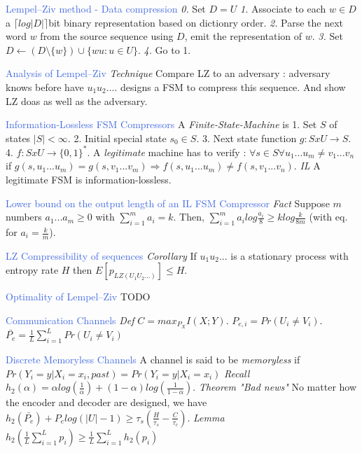 \documentclass[10pt,a4paper,landscape]{article}
\newcommand{\concept}[1]{\textcolor{RoyalBlue}{#1}}
\newcommand{\subconcept}[1]{\textcolor{PineGreen}{\textit{#1}}}
\renewcommand{\section}[1]{
    \vspace{-0.3cm}
    \begin{center}
      \color{Bittersweet}
      \hrulefill{\small~~#1~~}\hrulefill
    \end{center}
    \vspace{-0.3cm}
  }
\begin{document}
\begin{multicols*}{4}
\concept{Lempel–Ziv method - Data compression}
\subconcept{0.} Set $D=U$
\subconcept{1.} Associate to each $w \in D$ a $\lceil log|D| \rceil$bit binary representation based on dictionry order.
\subconcept{2.} Parse the next word $w$ from the source sequence using $D$, emit the representation of $w$.
\subconcept{3.} Set $D \leftarrow (D\setminus \{w\})\cup \{wu:u \in U \}$.
\subconcept{4.} Go to 1.

\concept{Analysis of Lempel–Ziv} 
\subconcept{Technique} Compare LZ to an adversary : 
adversary knows before have $u_1u_2...$.
designs a FSM to compress this sequence.
And show LZ doas as well as the adversary.


\concept{Information-Lossless FSM Compressors}
A \subconcept{Finite-State-Machine} is 1. Set $S$ of states $|S|<\infty$.
2. Initial special state $s_0 \in S$.
3. Next state function $g:SxU \to S$.
4. $f:SxU \to \{ 0,1 \}^*$.
A \subconcept{legitimate} machine has to verify :
$\forall s \in S \forall u_1...u_m \neq v_1...v_n$ if $g(s,u_1...u_m)=g(s,v_1...v_m) \Rightarrow f(s,u_1...u_m) \neq f(s,v_1...v_n)$.
\subconcept{IL} A legitimate FSM is information-lossless.

\concept{Lower bound on the output length of an IL FSM Compressor} 
\subconcept{Fact} Suppose $m$ numbers $a_1...a_m \ge 0$ with $\sum_{i=1}^m a_i=k$.
Then, $\sum_{i=1}^m a_i log \frac{a_i}{8} \ge k log \frac{k}{8m}$ (with eq. for $a_i=\frac{k}{m}$).

\concept{LZ Compressibility of sequences} 
\subconcept{Corollary} If $u_1u_2...$ is a stationary process with entropy rate $H$ then $E[p_{LZ(U_1U_2...)}] \le H$.

\concept{Optimality of Lempel–Ziv} TODO

\section{Channels}

\concept{Communication Channels} 
\subconcept{Def}
$C=max_{P_X} I(X;Y)$.
$P_{e,i}=Pr(U_i \neq V_i)$. 
$\bar{P_e}=\frac{1}{L} \sum_{i=1}^L Pr(U_i \neq V_i)$

\concept{Discrete Memoryless Channels} 
A channel is said to be \subconcept{memoryless} if $Pr(Y_i=y|X_i=x_i,past)=Pr(Y_i=y|X_i=x_i)$
\subconcept{Recall} $h_2(\alpha)=\alpha log( \frac{1}{\alpha})+(1-\alpha) log (\frac{1}{1-\alpha})$.
\subconcept{Theorem "Bad news"} No matter how the encoder and decoder are designed, we have $h_2(\bar{P_e})+P_e log(|U|-1) \ge \tau_s (\frac{H}{\tau_s}-\frac{C}{\tau_c})$.
\subconcept{Lemma} $h_2(\frac{1}{L} \sum_{i=1}^L p_i) \ge \frac{1}{L}\sum_{i=1}^L h_2(p_i)$


\end{multicols*}
\end{document}
